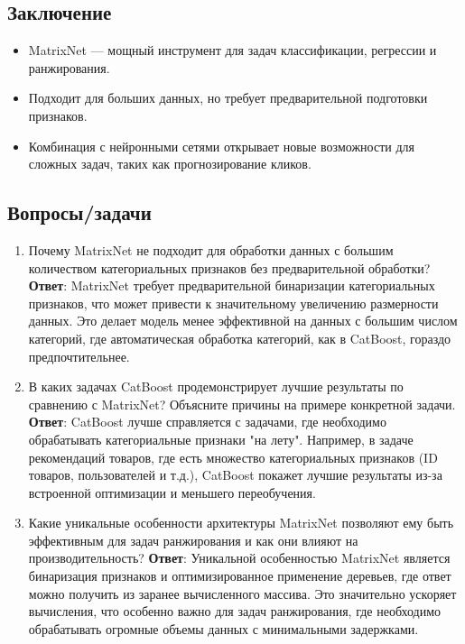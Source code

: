 \subsection{Заключение}
\begin{itemize}
    \item MatrixNet — мощный инструмент для задач классификации, регрессии и ранжирования.
    \item Подходит для больших данных, но требует предварительной подготовки признаков.
    \item Комбинация с нейронными сетями открывает новые возможности для сложных задач, таких как прогнозирование кликов.
\end{itemize}

\subsection{Вопросы/задачи}
\begin{enumerate}
    \item Почему MatrixNet не подходит для обработки данных с большим количеством категориальных признаков без предварительной обработки?
    \textbf{Ответ}: MatrixNet требует предварительной бинаризации категориальных признаков, что может привести к значительному увеличению размерности данных. Это делает модель менее эффективной на данных с большим числом категорий, где автоматическая обработка категорий, как в CatBoost, гораздо предпочтительнее.
    
    \item В каких задачах CatBoost продемонстрирует лучшие результаты по сравнению с MatrixNet? Объясните причины на примере конкретной задачи.
    \textbf{Ответ}: CatBoost лучше справляется с задачами, где необходимо обрабатывать категориальные признаки "на лету". Например, в задаче рекомендаций товаров, где есть множество категориальных признаков (ID товаров, пользователей и т.д.), CatBoost покажет лучшие результаты из-за встроенной оптимизации и меньшего переобучения.
    
    \item Какие уникальные особенности архитектуры MatrixNet позволяют ему быть эффективным для задач ранжирования и как они влияют на производительность?
    \textbf{Ответ}: Уникальной особенностью MatrixNet является бинаризация признаков и оптимизированное применение деревьев, где ответ можно получить из заранее вычисленного массива. Это значительно ускоряет вычисления, что особенно важно для задач ранжирования, где необходимо обрабатывать огромные объемы данных с минимальными задержками.
\end{enumerate}


